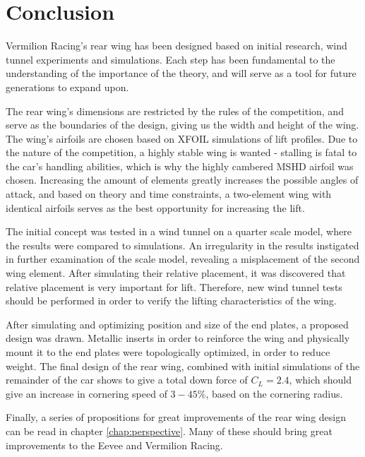 \chapter{Conclusion}
  Vermilion Racing's rear wing has been designed based on initial research, wind tunnel experiments and simulations. Each step has been fundamental to the understanding of the importance of the theory, and will serve as a tool for future generations to expand upon.

  The rear wing's dimensions are restricted by the rules of the competition, and serve as the boundaries of the design, giving us the width and height of the wing. The wing's airfoils are chosen based on XFOIL simulations of lift profiles. Due to the nature of the competition, a highly stable wing is wanted - stalling is fatal to the car's handling abilities, which is why the highly cambered MSHD airfoil was chosen. Increasing the amount of elements greatly increases the possible angles of attack, and based on theory and time constraints, a two-element wing with identical airfoils serves as the best opportunity for increasing the lift.

  The initial concept was tested in a wind tunnel on a quarter scale model, where the results were compared to simulations. An irregularity in the results instigated in further examination of the scale model, revealing a misplacement of the second wing element. After simulating their relative placement, it was discovered that relative placement is very important for lift. Therefore, new wind tunnel tests should be performed in order to verify the lifting characteristics of the wing.

  After simulating and optimizing position and size of the end plates, a proposed design was drawn. Metallic inserts in order to reinforce the wing and physically mount it to the end plates were topologically optimized, in order to reduce weight. The final design of the rear wing, combined with initial simulations of the remainder of the car shows to give a total down force of $C_L = 2.4$, which should give an increase in cornering speed of $3-45\%$, based on the cornering radius.

  Finally, a series of propositions for great improvements of the rear wing design can be read in chapter \ref{chap:perspective}. Many of these should bring great improvements to the Eevee and Vermilion Racing.

